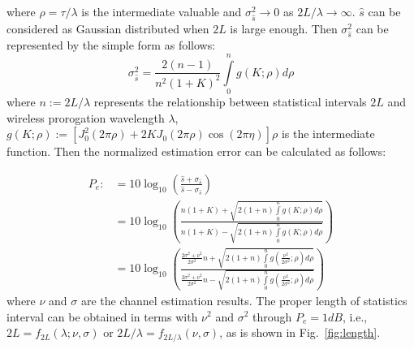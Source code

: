 where $\rho=\tau/\lambda$ is the intermediate valuable and $\sigma_{\hat{s}}^2\rightarrow0$ as $2L/\lambda\rightarrow\infty$. $\hat{s}$ can be considered as Gaussian distributed when $2L$ is large enough. Then $\sigma_{\hat{s}}^2$ can be represented by the simple form as follows:
\begin{equation}
\sigma_{\hat{s}}^2=\frac{2(n-1)}{n^2(1+K)^2}\int\limits_0^n g(K;\rho) d\rho
\label{app:sigmareplace}
\end{equation}
where $n:=2L/\lambda$ represents the relationship between statistical intervals $2L$ and wireless prorogation wavelength $\lambda$, $g(K;\rho):=[J_0^2(2\pi \rho)+2KJ_0(2\pi \rho)\cos(2\pi \eta)]\rho$ is the intermediate function. Then the normalized estimation error can be calculated as follows:

\begin{equation}
\begin{split}
P_e:&=10 \log_{10}\left(\frac{\hat{s}+\sigma_{\hat{s}}}{\hat{s}-\sigma_{\hat{s}}}\right) \\
    &=10 \log_{10}\left(\frac{n(1+K)+\sqrt{2(1+n)\int\limits_0^n g(K;\rho) d\rho}}{n(1+K)-\sqrt{2(1+n)\int\limits_0^n g(K;\rho) d\rho}}\right) \\
    &= 10 \log_{10}\left(\frac{\frac{2\sigma^2+\nu^2}{2\sigma^2}n+\sqrt{2(1+n)\int\limits_0^n g\left(\frac{\nu^2}{2\sigma^2};\rho\right) d\rho}}{\frac{2\sigma^2+\nu^2}{2\sigma^2}n-\sqrt{2(1+n)\int\limits_0^n g\left(\frac{\nu^2}{2\sigma^2};\rho\right) d\rho}}\right)
\end{split}
\label{app:Perror}
\end{equation}
where $\nu$ and $\sigma$ are the channel estimation results. The proper length of statistics interval can be obtained in terms with $\nu^2$ and $\sigma^2$ through $P_e=1dB$, i.e., $2L=f_{2L}(\lambda;\nu,\sigma)$ or $2L/\lambda=f_{2L/\lambda}(\nu,\sigma)$, as is shown in Fig.~\ref{fig:length}.

\begin{figure}[!htp]
  \centering
    \hspace{1cm}
  \hspace{1in}
  \centering
    \hspace{1cm}
\end{figure}

